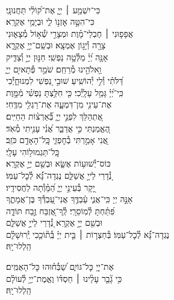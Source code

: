 \documentclass[twoside, openany, parskip=half, 11pt]{book}
\begin{document}
{\begin{narrow}
\\
כִּי־יִשְׁמַ֥ע ׀ יְיָ֑ \hfill אֶת־ק֝וֹלִ֗י תַּחֲנוּנָֽי׃ \\
כִּי־הִטָּ֣ה אׇזְנ֣וֹ לִ֑י \hfill וּבְיָמַ֥י אֶקְרָֽא׃ \\
אֲפָפ֤וּנִי ׀ חֶבְלֵי־מָ֗וֶת \hfill וּמְצָרֵ֣י שְׁ֯א֣וֹל מְ֯צָא֑וּנִי\\ צָרָ֖ה וְ֯יָג֣וֹן אֶמְצָֽא׃ \hfill
וּבְשֵֽׁם־יְיָ֥ אֶקְרָ֑א\\ אָנָּ֥ה יְ֝יָ֗ מַלְּ֯טָ֥ה נַפְשִֽׁי׃ \hfill
חַנּ֣וּן יְיָ֣ וְ֯צַדִּ֑יק\\ וֵ֖אלֹהֵ֣ינוּ מְ֯רַחֵֽם׃ \hfill
שֹׁמֵ֣ר פְּ֯תָאיִ֣ם יְיָ֑\\ דַּ֝לֹּתִ֗י וְ֯לִ֣י יְ֯הוֹשִֽׁיעַ׃ \hfill
שׁוּבִ֣י נַ֭פְשִׁי לִמְנוּחָ֑יְ֯כִי\\ כִּֽי־יְ֝יָ֗ גָּמַ֥ל עָלָֽיְ֯כִי׃ \hfill
כִּ֤י חִלַּ֥צְתָּ נַפְשִׁ֗י מִ֫מָּ֥וֶת\\ אֶת־עֵינִ֥י מִן־דִּמְעָ֑ה \hfill אֶת־רַגְלִ֥י מִדֶּֽחִי׃ \\
אֶ֭תְהַלֵּךְ לִפְנֵ֣י יְיָ֑ \hfill בְּ֯֝אַרְצ֗וֹת הַחַיִּֽים׃ \\
הֶ֭אֱמַנְתִּי כִּ֣י אֲדַבֵּ֑ר \hfill אֲ֝נִ֗י עָנִ֥יתִי מְ֯אֹֽד׃ \\
אֲ֭נִי אָמַ֣רְתִּי בְ֯חׇפְזִ֑י \hfill כׇּֽל־הָאָדָ֥ם כֹּזֵֽב׃ \\

 \hfill
כׇּֽל־תַּגְמוּל֥וֹהִי עָלָֽי׃ \\
כּוֹס־יְ֯שׁוּע֥וֹת אֶשָּׂ֑א \hfill וּבְשֵׁ֖ם יְיָ֣ אֶקְרָֽא׃ \\
נְ֭֯דָרַי לַייָ֣ אֲשַׁלֵּ֑ם \hfill נֶגְדָה־נָּ֗֝א לְ֯כׇל־עַמּֽוֹ׃ \\
יָ֭קָר בְּ֯עֵינֵ֣י יְיָ֑ \hfill הַ֝מָּ֗וְ֯תָה לַחֲסִידָֽיו׃ \\
אָנָּ֣ה יְיָ כִּֽי־אֲנִ֢י עַ֫בְדֶּ֥ךָ \hfill אֲנִי־עַ֭בְדְּ֯ךָ בֶּן־אֲמָתֶ֑ךָ\\ פִּ֝תַּ֗חְתָּ לְ֯מֽוֹסֵרָֽי׃ \hfill
לְֽ֯ךָ־אֶ֭זְבַּח זֶ֣בַח תּוֹדָ֑ה\\ וּבְשֵׁ֖ם יְיָ֣ אֶקְרָֽא׃ \hfill
נְ֭֯דָרַי לַייָ֣ אֲשַׁלֵּ֑ם \\ נֶגְדָה־נָּ֗֝א לְ֯כׇל־עַמּֽוֹ׃ \hfill
בְּ֯חַצְר֤וֹת ׀ בֵּ֤ית יְיָ֗ בְּֽ֯ת֘וֹכֵ֤כִי יְֽ֯רוּשָׁלָ֗‍ִם\\
הַֽלְלוּ־יָֽהּ׃ \hfill \break



אֶת־יְיָ֭ כׇּל־גּוֹיִ֑ם \hfill שַׁ֝בְּ֯ח֗וּהוּ כׇּל־הָאֻמִּֽים׃ \\
כִּ֥י גָ֘בַ֤ר עָלֵ֨ינוּ ׀ חַסְדּ֗וֹ \hfill וֶאֱמֶת־יְיָ֥ לְ֯עוֹלָ֗ם\\
הַֽלְלוּ־יָֽהּ׃ \hfill \break


\end{narrow}}
\end{document}
